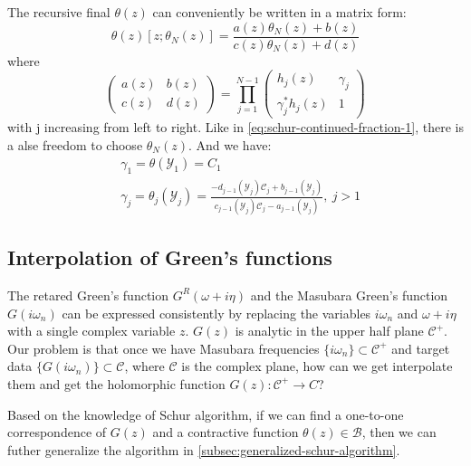 \documentclass[
	preprint,%
	aps,
	prb,
	showpacs,	
	amsmath, amssymb]{revtex4-2}
\newcommand{\Y}{ {\mathcal{Y}} }
\newcommand{\C}{ {\mathcal{C}} }
\newcommand{\B}{ {\mathcal{B}} }
\begin{document}
The recursive final $\theta(z)$ can conveniently be written in a
matrix form:
\begin{equation}\label{eq:recursive-theta}
	\theta(z)[z;\theta_N(z)] 
		= \frac{a(z)\theta_N(z) + b(z)}{c(z)\theta_N(z) + d(z)}
\end{equation}
where
\begin{equation}\label{eq:factor-matrix}
	\left(
		\begin{matrix}
			a(z) & b(z) \\
			c(z) & d(z)
		\end{matrix}
	\right) = \prod_{j=1}^{N-1}
	\left(
		\begin{matrix}
			h_j(z)            & \gamma_j \\
			\gamma_j^* h_j(z) & 1
		\end{matrix}
	\right)
\end{equation}
with j increasing from left to right. Like in \cref{eq:schur-continued-fraction-1}, 
there is a alse freedom to choose $\theta_N(z)$. And we have:
\begin{align}
	\label{eq:schur-parameter-1}
	&\gamma_1 = \theta(\Y_1) = C_1 \\
	\label{eq:schur-parameter-2}
	&\gamma_j = \theta_j(\Y_j)
	= \frac{-d_{j-1}(\Y_j) \C_j + b_{j-1}(\Y_j)}
		{c_{j-1}(\Y_j) \C_j - a_{j-1}(\Y_j)}
		, \ j>1
\end{align}


\subsection{Interpolation of Green's functions}
\label{subsec:interpolation-of-GF}

The retared Green's function $G^R(\omega + i\eta)$ and the Masubara 
Green's function $G(i\omega_n)$ can be expressed consistently by replacing 
the variables $i\omega_n$ and $\omega + i\eta$ with a single complex 
variable $z$. $G(z)$ is analytic in the upper half plane $\C^+$. 
Our problem is that once we have Masubara frequencies 
$\{i\omega_n\} \subset \C^+$ 
and target data $\{ G(i\omega_n)\} \subset  \C$, where $\C$ is 
the complex plane, how can we get interpolate them and get the 
holomorphic function $G(z):\C^+ \to C$?

Based on the knowledge of Schur algorithm, if we can find 
a one-to-one correspondence of $G(z)$ and a contractive 
function $\theta(z) \in \B$, then we can futher generalize 
the algorithm in \cref{subsec:generalized-schur-algorithm}.
\end{document}

